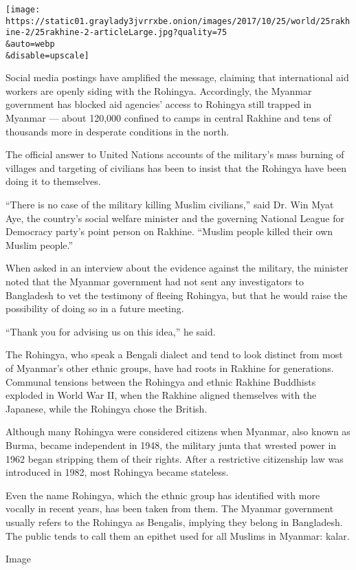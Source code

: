 \texttt{[image: https://static01.graylady3jvrrxbe.onion/images/2017/10/25/world/25rakhine-2/25rakhine-2-articleLarge.jpg?quality=75\\\&auto=webp\\\&disable=upscale]}

Social media postings have amplified the message, claiming that
international aid workers are openly siding with the Rohingya.
Accordingly, the Myanmar government has blocked aid agencies' access to
Rohingya still trapped in Myanmar --- about 120,000 confined to camps in
central Rakhine and tens of thousands more in desperate conditions in
the north.

The official answer to United Nations accounts of the military's mass
burning of villages and targeting of civilians has been to insist that
the Rohingya have been doing it to themselves.

``There is no case of the military killing Muslim civilians,'' said Dr.
Win Myat Aye, the country's social welfare minister and the governing
National League for Democracy party's point person on Rakhine. ``Muslim
people killed their own Muslim people.''

When asked in an interview about the evidence against the military, the
minister noted that the Myanmar government had not sent any
investigators to Bangladesh to vet the testimony of fleeing Rohingya,
but that he would raise the possibility of doing so in a future meeting.

``Thank you for advising us on this idea,'' he said.

The Rohingya, who speak a Bengali dialect and tend to look distinct from
most of Myanmar's other ethnic groups, have had roots in Rakhine for
generations. Communal tensions between the Rohingya and ethnic Rakhine
Buddhists exploded in World War II, when the Rakhine aligned themselves
with the Japanese, while the Rohingya chose the British.

Although many Rohingya were considered citizens when Myanmar, also known
as Burma, became independent in 1948, the military junta that wrested
power in 1962 began stripping them of their rights. After a restrictive
citizenship law was introduced in 1982, most Rohingya became stateless.

Even the name Rohingya, which the ethnic group has identified with more
vocally in recent years, has been taken from them. The Myanmar
government usually refers to the Rohingya as Bengalis, implying they
belong in Bangladesh. The public tends to call them an epithet used for
all Muslims in Myanmar: kalar.

Image


